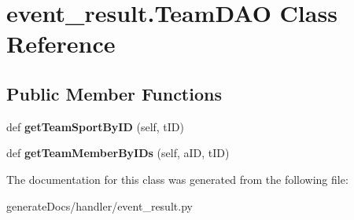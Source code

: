 \hypertarget{classevent__result_1_1_team_d_a_o}{}\section{event\+\_\+result.\+Team\+D\+AO Class Reference}
\label{classevent__result_1_1_team_d_a_o}
\subsection*{Public Member Functions}
\begin{DoxyCompactItemize}
\item 
\mbox{\label{classevent__result_1_1_team_d_a_o_abea8fbeaf193379333724868b376d11b}} 
def {\bfseries get\+Team\+Sport\+By\+ID} (self, t\+ID)
\item 
\mbox{\label{classevent__result_1_1_team_d_a_o_adaefe29956ad6f45c712dac312c7b3c7}} 
def {\bfseries get\+Team\+Member\+By\+I\+Ds} (self, a\+ID, t\+ID)
\end{DoxyCompactItemize}


The documentation for this class was generated from the following file\+:\begin{DoxyCompactItemize}
\item 
generate\+Docs/handler/event\+\_\+result.\+py\end{DoxyCompactItemize}
